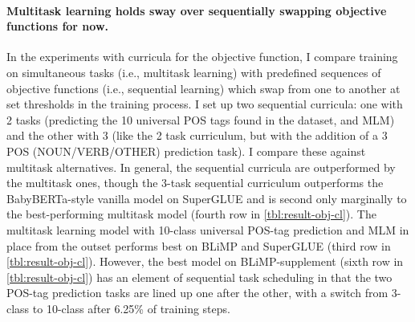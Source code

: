 \paragraph{Multitask learning holds sway over sequentially swapping objective functions for now.}
In the experiments with curricula for the objective function, I compare training on simultaneous tasks (i.e., multitask learning) with predefined sequences of objective functions (i.e., sequential learning) which swap from one to another at set thresholds in the training process. I set up two sequential curricula: one with 2 tasks (predicting the 10 universal POS tags found in the dataset, and MLM) and the other with 3 (like the 2 task curriculum, but with the addition of a 3 POS (NOUN/VERB/OTHER) prediction task). I compare these against multitask alternatives. In general, the sequential curricula are outperformed by the multitask ones, though the 3-task sequential curriculum outperforms the BabyBERTa-style vanilla model on SuperGLUE and is second only marginally to the best-performing multitask model (fourth row in \cref{tbl:result-obj-cl}). The multitask learning model with 10-class universal POS-tag prediction and MLM in place from the outset performs best on BLiMP and SuperGLUE (third row in \cref{tbl:result-obj-cl}). However, the best model on BLiMP-supplement (sixth row in \cref{tbl:result-obj-cl}) has an element of sequential task scheduling in that the two POS-tag prediction tasks are lined up one after the other, with a switch from 3-class to 10-class after 6.25\% of training steps. %

\vspace{1em}


